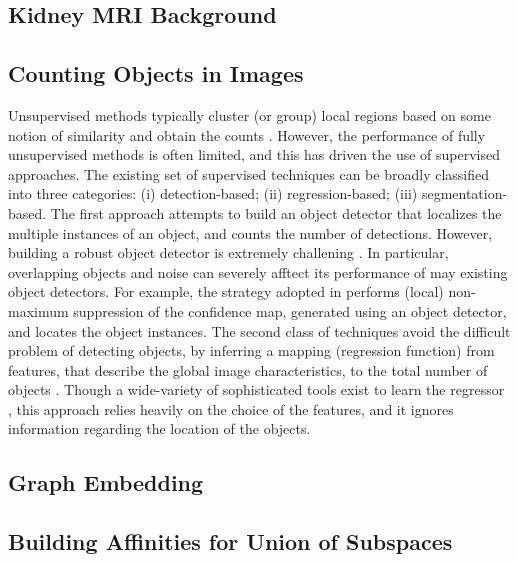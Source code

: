 \subsection{Kidney MRI Background}

\subsection{Counting Objects in Images}
Unsupervised methods typically cluster (or group) local regions based on some notion of similarity and obtain the counts \cite{}. However, the performance of fully unsupervised methods is often limited, and this has driven the use of supervised approaches. The existing set of supervised techniques can be broadly classified into three categories: (i) detection-based; (ii) regression-based; (iii) segmentation-based. The first approach attempts to build an object detector that localizes the multiple instances of an object, and counts the number of detections. However, building a robust object detector is extremely challening \cite{}. In particular, overlapping objects and noise can severely afftect its performance of may existing object detectors. For example, the strategy adopted in \cite{} performs (local) non-maximum suppression of the confidence map, generated using an object detector, and locates the object instances. The second class of techniques avoid the difficult problem of detecting objects, by inferring a mapping (regression function) from features, that describe the global image characteristics, to the total number of objects \cite{}. Though a wide-variety of sophisticated tools exist to learn the regressor \cite{}, this approach relies heavily on the choice of the features, and it ignores information regarding the location of the objects. 

\subsection{Graph Embedding}

\subsection{Building Affinities for Union of Subspaces}

